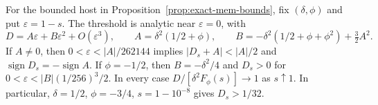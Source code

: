 \begin{proposition}
\label{prop:exact-mem-long}
For the bounded host in Proposition~\ref{prop:exact-mem-bounds}, fix
$(\delta,\phi)$ and put $\varepsilon=1-s$. The threshold is analytic
near $\varepsilon=0$, with
\begin{equation}
 D=A\varepsilon+B\varepsilon^2+O(\varepsilon^3),\qquad
 A=\delta^2(1/2+\phi),\qquad
 B=-\delta^2(1/2+\phi+\phi^2)+\tfrac32 A^2.
 \label{eq:exact-mem-long}
\end{equation}
If $A\ne0$, then $0<\varepsilon<|A|/262144$ implies
$|D_s+A|<|A|/2$ and $\operatorname{sign}D_s=-\operatorname{sign}A$.
If $\phi=-1/2$, then $B=-\delta^2/4$ and $D_s>0$ for
$0<\varepsilon<|B|(1/256)^3/2$. In every case
$D/[\delta^2F_\phi(s)]\to1$ as $s\uparrow1$.
In particular, $\delta=1/2$, $\phi=-3/4$, $s=1-10^{-8}$ gives
$D_s>1/32$.
\end{proposition}

